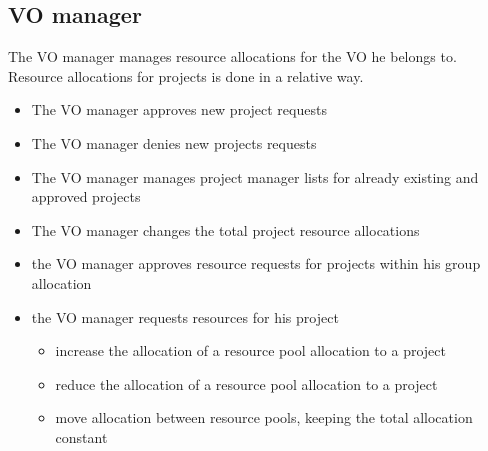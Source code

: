 \documentclass[12pt]{article}
\begin{document}
\subsection{VO manager}
The VO manager manages resource allocations for the VO he belongs to. Resource allocations for projects is done in a relative way. 
\begin{itemize} \item The VO manager approves new project requests
\item The VO manager denies new projects requests
\item The VO manager manages project manager lists for already existing and approved projects
\item The VO manager changes the total project resource allocations
\item the VO manager approves resource requests for projects within his group allocation
\item the VO manager requests resources for his project 
  \begin{itemize}
    \item increase the allocation of a resource pool allocation to a project
    \item reduce the allocation  of a resource pool allocation to a project
    \item move allocation between resource pools, keeping the total allocation constant
  \end{itemize}
\end{itemize}
\end{document}
